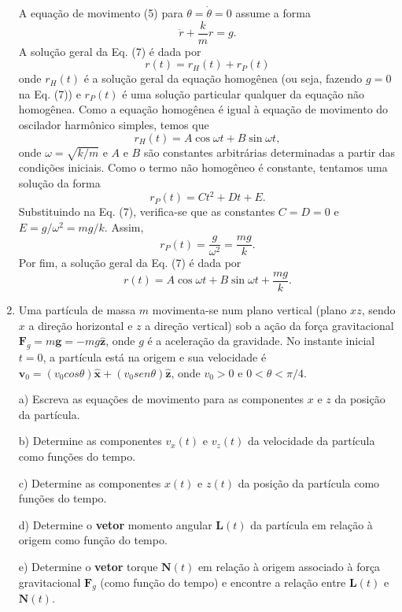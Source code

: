 \begin{enumerate}[start=1,label={\bfseries Q\arabic*.}]
\resposta A equação de movimento (5) para $\theta = \dot{\theta} = 0$ assume a forma
$$
\ddot{r} + \frac{k}{m} r = g.
$$
A solução geral da Eq. (7) é dada por
$$
r(t) = r_{H}(t) + r_{P}(t)
$$
onde $r_{H}(t)$ é a solução geral da equação homogênea (ou seja, fazendo $g = 0$ na Eq. (7)) e $r_{P}(t)$ é uma solução particular qualquer da equação não homogênea. Como a equação homogênea é igual à equação de movimento do oscilador harmônico simples, temos que
$$
r_{H}(t) = A \cos \omega t + B \sin \omega t,
$$
onde $\omega = \sqrt{k/m}$ e $A$ e $B$ são constantes arbitrárias determinadas a partir das condições iniciais. Como o termo não homogêneo é constante, tentamos uma solução da forma
$$
r_{P}(t) = Ct^{2} + Dt + E.
$$
Substituindo na Eq. (7), verifica-se que as constantes $C = D = 0$ e $E = g/\omega^{2} = mg/k$. Assim,
$$
r_{P}(t) = \frac{g}{\omega^{2}} = \frac{mg}{k}.
$$
Por fim, a solução geral da Eq. (7) é dada por
$$
r(t) = A \cos \omega t + B \sin \omega t + \frac{mg}{k}.
$$








\item Uma partícula de massa $m$  movimenta-se num plano vertical (plano $xz$, sendo $x$ a direção horizontal e $z$ a direção vertical) sob a ação da força gravitacional $\mathbf{F}_{g} = m \mathbf{g} = - m g \hat{\mathbf{z}}$, onde $g$ é a aceleração da gravidade. No instante inicial $t=0$, a partícula está na origem e sua velocidade é $\mathbf{v}_{0} = (v_{0} cos \theta) \hat{\mathbf{x}} + (v_{0} sen \theta) \hat{\mathbf{z}}$, onde $v_{0} > 0$ e $0 < \theta < \pi/4$.



a) Escreva as equações de movimento para as componentes $x$ e $z$ da posição da partícula.

\resposta

b) Determine as componentes $v_{x}(t)$ e $v_{z}(t)$ da velocidade da partícula como funções do tempo.

\resposta

c) Determine as componentes $x(t)$ e $z(t)$ da posição da partícula como funções do tempo.

\resposta

d) Determine o \textbf{vetor} momento angular $\mathbf{L}(t)$ da partícula em relação à origem como função do tempo.

\resposta

e) Determine o \textbf{vetor} torque $\mathbf{N}(t)$ em relação à origem associado à força gravitacional $\mathbf{F}_{g}$ (como função do tempo) e encontre a relação entre $\mathbf{L}(t)$ e $\mathbf{N}(t)$.


\end{enumerate}
